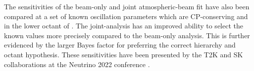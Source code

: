 \begin{table}[ht!]
  \centering
  \begingroup
  \renewcommand{\arraystretch}{1.5}
  \caption{}
  \label{tab:Conclusion_Summary}
  \endgroup
\end{table}

The sensitivities of the beam-only and joint atmospheric-beam fit have also been compared at a set of known oscillation parameters which are CP-conserving and in the lower octant of . The joint-analysis has an  improved ability to select the known values more precisely compared to the beam-only analysis. This is further evidenced by the larger Bayes factor for preferring the correct hierarchy and octant hypothesis. These sensitivities have been presented by the T2K and SK collaborations at the Neutrino 2022 conference \cite{Bronner2022-wd}.

